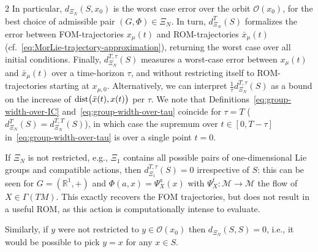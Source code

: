 \documentclass{article}
\newcommand{\yannik}[1]{\textcolor{blue}{\textbf{YW}:~#1}}
\newcommand{\M}{\mathcal{M}}                                %
\newcommand{\R}{\mathbb{R}}                                 %
\newcommand{\state}{x}
\newcommand{\appstate}{\bar{x}}
\begin{document}
\begin{multicols}{2}
In particular, $d_{\Xi_N}(S,\state_0)$ is the worst case error over the orbit $\mathcal{O}(\state_0)$, for the best choice of admissible pair $(G,\Phi) \in \Xi_N$. In turn, $d^T_{\Xi_N}(S)$ formalizes the error between FOM-trajectories $\state_\mu(t)$ and ROM-trajectories $\appstate_\mu(t)$ (cf.~\eqref{eq:MorLie-trajectory-approximation}), returning the worst case over all initial conditions. Finally, $d^{T,\tau}_{\Xi_N}(S)$ measures a worst-case error between $\state_\mu(t)$ and $\appstate_\mu(t)$ over a time-horizon $\tau$, and without restricting itself to ROM-trajectories starting at $x_{\mu,0}$. Alternatively, we can interpret $\frac{1}{\tau}d^{T,\tau}_{\Xi_N}(S)$ as a bound on the increase of $\textnormal{dist}\big(\bar{\state}(t),\state(t)\big)$ per $\tau$. We note that Definitions~\eqref{eq:group-width-over-IC} and~\eqref{eq:group-width-over-tau} coincide for $\tau = T$ ($d^{T}_{\Xi_N}(S) = d^{T,T}_{\Xi_N}(S)$), in which case the supremum over $t \in [0, T - \tau]$ in~\eqref{eq:group-width-over-tau} is over a single point $t = 0$. 

If $\Xi_N$ is not restricted, e.g., $\Xi_1$ contains all possible pairs of one-dimensional Lie groups and compatible actions, then $d^{T,\tau}_{\Xi_1}(S) = 0$ irrespective of $S$: this can be seen for $G = (\R^1,+)$ and $\Phi(a,\state) = \Psi^a_X(\state)$ with $\Psi^t_X:\M\rightarrow\M$ the flow of $X \in \Gamma(TM)$. This exactly recovers the FOM trajectories, but does not result in a useful ROM, as this action is computationally intense to evaluate.

Similarly, if $y$ were not restricted to $y \in \mathcal{O}(\state_0)$ then $d_{\Xi_N}(S,S) = 0$, i.e., it would be possible to pick $y = \state$ for any $\state\in S$. 


\end{multicols}
\end{document}
